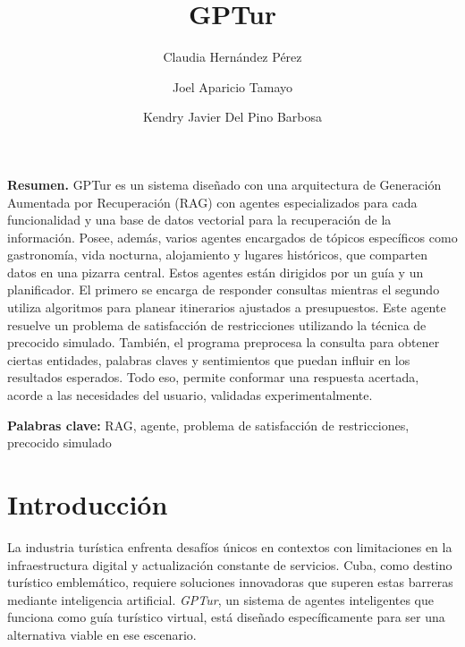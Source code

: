 \documentclass[10pt]{llncs}
\renewenvironment{abstract}{%
  \small
  \begin{list}{}{%
    \setlength{\leftmargin}{1cm}%
    \setlength{\rightmargin}{1cm}%
  }
  \item\relax\ignorespaces}
  {\end{list}\vspace{2\baselineskip}}
\begin{document}
\title{GPTur}

\author{Claudia Hernández Pérez \and Joel Aparicio Tamayo \and Kendry Javier Del Pino Barbosa}


\maketitle

\begin{abstract} \textbf{Resumen.}
GPTur es un sistema diseñado con una arquitectura de Generación Aumentada por Recuperación (RAG) con agentes especializados para cada funcionalidad y una base de datos 
vectorial para la recuperación de la información. Posee, además, varios agentes encargados de tópicos específicos como gastronomía, 
vida nocturna, alojamiento y lugares históricos, que comparten datos en una pizarra central. Estos 
agentes están dirigidos por un guía y un planificador. El primero se encarga de responder consultas mientras el segundo utiliza algoritmos para planear 
itinerarios ajustados a presupuestos. Este agente resuelve un problema de satisfacción de restricciones utilizando la técnica de precocido simulado. También, el programa 
preprocesa la consulta para obtener ciertas entidades, palabras claves y sentimientos que puedan influir en los resultados esperados. Todo eso, permite conformar una respuesta acertada, 
acorde a las necesidades del usuario, validadas experimentalmente.
\par
\vspace{2\baselineskip}
\textbf{Palabras clave:} RAG, agente, problema de satisfacción de restricciones, precocido simulado
\end{abstract}

\section{Introducción}\label{sec:intro}
La industria turística enfrenta desafíos únicos en contextos con limitaciones en la infraestructura digital y 
actualización constante de servicios. Cuba, como destino turístico emblemático, requiere soluciones 
innovadoras que superen estas barreras mediante inteligencia artificial. \textit{GPTur}, 
un sistema de agentes inteligentes que funciona como guía turístico virtual, está diseñado específicamente 
para ser una alternativa viable en ese escenario.
\end{document}
